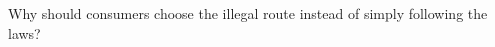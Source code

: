 \documentclass[preview]{standalone}
\begin{document}
\begin{center}
Why should consumers choose the illegal route
 instead of simply following the laws?
\end{center}
\end{document}
